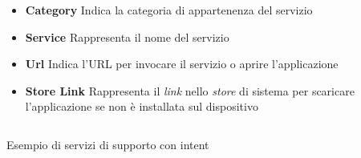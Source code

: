 \begin{itemize}
	\item \textbf{Category}
	Indica la categoria di appartenenza del servizio
	\item \textbf{Service}
	Rappresenta il nome del servizio
	\item \textbf{Url}
	Indica l'URL per invocare il servizio o aprire l'applicazione
	\item \textbf{Store Link}
	Rappresenta il \emph{link} nello \emph{store} di sistema per scaricare l'ap\-pli\-ca\-zio\-ne se non è installata sul dispositivo  
\end{itemize}

\begin{listing}[H]
	\inputminted{json}{6-implementazione-app/Codice/esempio_supporto_app.json}
	\caption{Esempio di servizi di supporto con intent}
	\label{lst:esempio-support-app}
\end{listing}